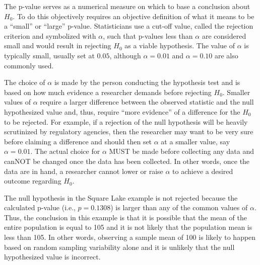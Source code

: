 \documentclass[10pt,openany]{book}\usepackage[]{graphicx}\usepackage[]{color}
\begin{document}

The p-value serves as a numerical measure on which to base a conclusion about $H_{0}$.  To do this objectively requires an objective definition of what it means to be a ``small'' or ``large'' p-value.  Statisticians use a cut-off value, called the rejection criterion and symbolized with $\alpha$, such that p-values less than $\alpha$ are considered small and would result in rejecting $H_{0}$ as a viable hypothesis.  The value of $\alpha$ is typically small, usually set at $0.05$, although $\alpha=0.01$ and $\alpha=0.10$ are also commonly used.


\vspace{-12pt}

The choice of $\alpha$ is made by the person conducting the hypothesis test and is based on how much evidence a researcher demands before rejecting $H_{0}$.  Smaller values of $\alpha$ require a larger difference between the observed statistic and the null hypothesized value and, thus, require ``more evidence'' of a difference for the $H_{0}$ to be rejected.  For example, if a rejection of the null hypothesis will be heavily scrutinized by regulatory agencies, then the researcher may want to be very sure before claiming a difference and should then set $\alpha$ at a smaller value, say $\alpha=0.01$.  The actual choice for $\alpha$ MUST be made before collecting any data and canNOT be changed once the data has been collected.  In other words, once the data are in hand, a researcher cannot lower or raise $\alpha$ to achieve a desired outcome regarding $H_{0}$.


\vspace{-12pt}

The null hypothesis in the Square Lake example is not rejected because the calculated p-value (i.e., $p=0.1308$) is larger than any of the common values of $\alpha$.  Thus, the conclusion in this example is that it is possible that the mean of the entire population is equal to 105 and it is not likely that the population mean is less than 105.  In other words, observing a sample mean of 100 is likely to happen based on random sampling variability alone and it is unlikely that the null hypothesized value is incorrect.
\end{document}
